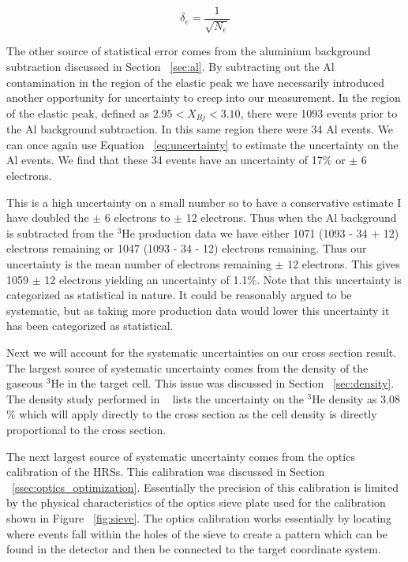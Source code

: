 \begin{equation} \label{eq:uncertainty}
	\delta_e = \frac{1}{\sqrt{N_e}}
\end{equation}

The other source of statistical error comes from the aluminium background subtraction discussed in Section ~\ref{sec:al}. By subtracting out the Al contamination in the region of the elastic peak we have necessarily introduced another opportunity for uncertainty to creep into our measurement. In the region of the elastic peak, defined as $2.95<X_{Bj}<3.10$, there were 1093 events prior to the Al background subtraction. In this same region there were 34 Al events. We can once again use Equation ~\ref{eq:uncertainty} to estimate the uncertainty on the Al events. We find that these 34 events have an uncertainty of 17$\%$ or $\pm$ 6 electrons. 

This is a high uncertainty on a small number so to have a conservative estimate I have doubled the $\pm$ 6 electrons to $\pm$ 12 electrons. Thus when the Al background is subtracted from the $^3$He production data we have either 1071 (1093 - 34 + 12) electrons remaining or 1047 (1093 - 34 - 12) electrons remaining. Thus our uncertainty is the mean number of electrons remaining $\pm$ 12 electrons. This gives 1059 $\pm$ 12 electrons yielding an uncertainty of 1.1$\%$. Note that this uncertainty is categorized as statistical in nature. It could be reasonably argued to be systematic, but as taking more production data would lower this uncertainty it has been categorized as statistical.

Next we will account for the systematic uncertainties on our cross section result. The largest source of systematic uncertainty comes from the density of the gaseous $^3$He in the target cell. This issue was discussed in Section ~\ref{sec:density}. The density study performed in ~\cite{density} lists the uncertainty on the  $^3$He density as 3.08$\%$ which will apply directly to the cross section as the cell density is directly proportional to the cross section.

The next largest source of systematic uncertainty comes from the optics calibration of the HRSs. This calibration was discussed in Section ~\ref{ssec:optics_optimization}. Essentially the precision of this calibration is limited by the physical characteristics of the optics sieve plate used for the calibration shown in Figure ~\ref{fig:sieve}. The optics calibration works essentially by locating where events fall within the holes of the sieve to create a pattern which can be found in the detector and then be connected to the target coordinate system. 

